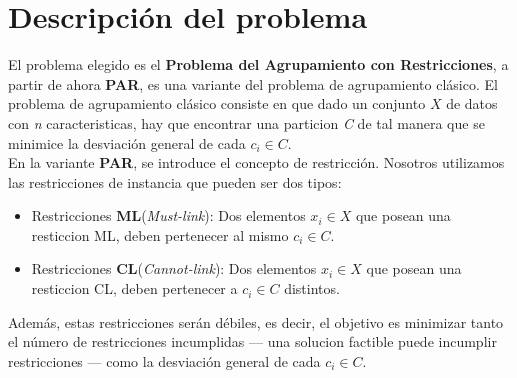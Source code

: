 \newpage
\section{Descripción del problema}
El problema elegido es el \textbf{Problema del Agrupamiento con Restricciones}, a partir de ahora \textbf{PAR}, es una variante del problema de agrupamiento clásico.
El problema de agrupamiento clásico consiste en que dado un conjunto $ X $ de datos con \emph{n} caracteristicas, hay que encontrar una particion \emph{C} de tal manera que se minimice la desviación general de cada $ c_{i} \in C $.\\
En la variante \textbf{PAR}, se introduce el concepto de restricción. Nosotros utilizamos las restricciones de instancia que pueden ser dos tipos:
\begin{itemize}
   \item Restricciones \textbf{ML}(\emph{Must-link}): Dos elementos $ x_{i} \in X $ que posean una resticcion ML, deben pertenecer al mismo $ c_{i} \in C $.
   \item Restricciones \textbf{CL}(\emph{Cannot-link}): Dos elementos $ x_{i} \in X $ que posean una resticcion CL, deben pertenecer a $ c_{i} \in C $ distintos.
\end{itemize}
Además, estas restricciones serán débiles, es decir, el objetivo es minimizar tanto el número de restricciones incumplidas --- una solucion factible puede incumplir restricciones --- como la desviación general de cada $ c_{i} \in C $.
